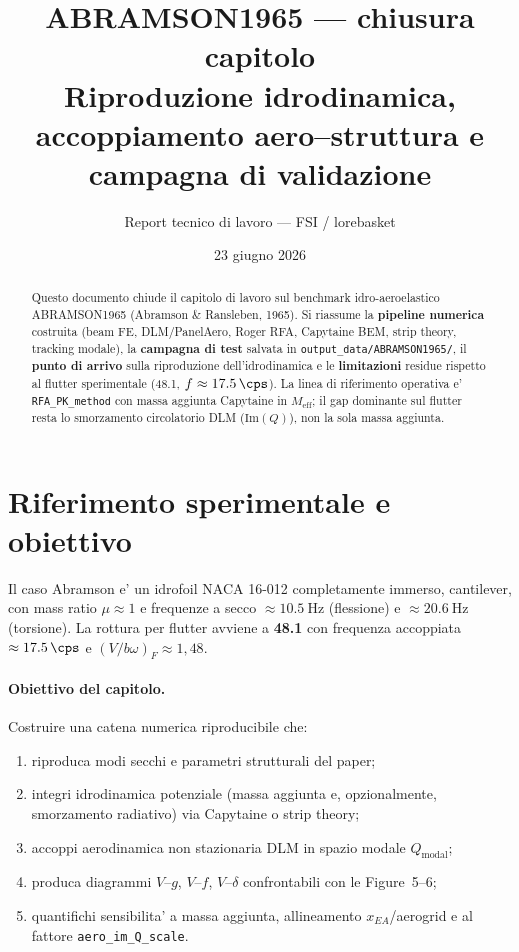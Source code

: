 \documentclass[11pt,a4paper]{article}
\title{ABRAMSON1965 --- chiusura capitolo\\[0.4em]
\large Riproduzione idrodinamica, accoppiamento aero--struttura e campagna di validazione}
\author{Report tecnico di lavoro --- FSI / lorebasket}
\date{23 giugno 2026}
\begin{document}
\maketitle

\begin{abstract}
Questo documento chiude il capitolo di lavoro sul benchmark idro-aeroelastico
ABRAMSON1965 (Abramson \& Ransleben, 1965).
Si riassume la \textbf{pipeline numerica} costruita (beam FE, DLM/PanelAero, Roger RFA,
Capytaine BEM, strip theory, tracking modale), la \textbf{campagna di test} salvata in
\texttt{output\_data/ABRAMSON1965/}, il \textbf{punto di arrivo} sulla riproduzione
dell'idrodinamica e le \textbf{limitazioni} residue rispetto al flutter sperimentale
(\SI{48.1}{\knunit}, $f\approx\SI{17.5}{\cps}$).
La linea di riferimento operativa e' \texttt{RFA\_PK\_method} con massa aggiunta
Capytaine in $M_\mathrm{eff}$; il gap dominante sul flutter resta lo
smorzamento circolatorio DLM ($\mathrm{Im}(Q)$), non la sola massa aggiunta.
\end{abstract}

\tableofcontents
\newpage

\section{Riferimento sperimentale e obiettivo}

Il caso Abramson e' un idrofoil NACA 16-012 completamente immerso, cantilever,
con mass ratio $\mu\approx 1$ e frequenze a secco $\approx\SI{10.5}{\hertz}$ (flessione)
e $\approx\SI{20.6}{\hertz}$ (torsione).
La rottura per flutter avviene a \textbf{\SI{48.1}{\knunit}} con frequenza accoppiata
$\approx\SI{17.5}{\cps}$ e $(V/b\omega)_F\approx 1{,}48$.

\paragraph{Obiettivo del capitolo.}
Costruire una catena numerica riproducibile che:
\begin{enumerate}[nosep]
  \item riproduca modi secchi e parametri strutturali del paper;
  \item integri idrodinamica potenziale (massa aggiunta e, opzionalmente, smorzamento radiativo)
        via Capytaine o strip theory;
  \item accoppi aerodinamica non stazionaria DLM in spazio modale $Q_\mathrm{modal}$;
  \item produca diagrammi $V$--$g$, $V$--$f$, $V$--$\delta$ confrontabili con le Figure~5--6;
  \item quantifichi sensibilita' a massa aggiunta, allineamento $x_{EA}$/aerogrid e
        al fattore \texttt{aero\_im\_Q\_scale}.
\end{enumerate}
\end{document}
